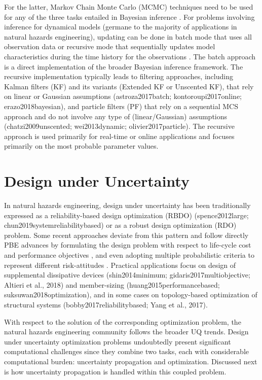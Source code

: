 For the latter, Markov Chain Monte Carlo (MCMC) techniques need to be used for any of the three tasks entailed in Bayesian inference \citep{catanach2018bayesian}. For problems involving inference for dynamical models (germane to the majority of applications in natural hazards engineering), updating can be done in batch mode that uses all observation data or recursive mode that sequentially updates model characteristics during the time history for the observations \citep{astroza2017batch}. The batch approach is a direct implementation of the broader Bayesian inference framework. The recursive implementation typically leads to filtering approaches, including Kalman filters (KF) and its variants (Extended KF or Unscented KF), that rely on linear or Gaussian assumptions (astroza2017batch; kontoroupi2017online; erazo2018bayesian), and particle filters (PF) that rely on a sequential MCS approach and do not involve any type of (linear/Gaussian) assumptions (chatzi2009unscented; wei2013dynamic; olivier2017particle). The recursive approach is used primarily for real-time or online applications and focuses primarily on the most probable parameter values. 

\section{Design under Uncertainty}
\label{sec:uq_design}

In natural hazards engineering, design under uncertainty has been traditionally expressed as a reliability-based design optimization (RBDO) (spence2012large; chun2019systemreliabilitybased) or as a robust design optimization (RDO) \citep{greco2015robust} problem. Some recent approaches deviate from this pattern and follow directly PBE advances by formulating the design problem with respect to life-cycle cost and performance objectives \citep{shin2014minimum}, and even adopting multiple probabilistic criteria to represent different risk-attitudes \citep{gidaris2017multiobjective}. Practical applications focus on design of supplemental dissipative devices (shin2014minimum; gidaris2017multiobjective; Altieri et al., 2018) and member-sizing (huang2015performancebased; suksuwan2018optimization), and in some cases on topology-based optimization of structural systems (bobby2017reliabilitybased; Yang et al., 2017).

With respect to the solution of the corresponding optimization problem, the natural hazards engineering community follows the broader UQ trends. Design under uncertainty optimization problems undoubtedly present significant computational challenges since they combine two tasks, each with considerable computational burden: uncertainty propagation and optimization. Discussed next is how uncertainty propagation is handled within this coupled problem.

